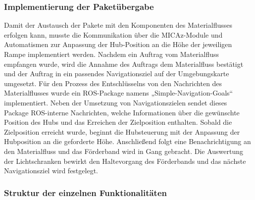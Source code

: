 \subsubsection{Implementierung der Paketübergabe}
Damit der Austausch der Pakete mit den Komponenten des Materialflusses erfolgen kann, musste die Kommunikation über die MICAz-Module und Automatismen zur Anpassung der Hub-Position an die Höhe der jeweiligen Rampe implementiert werden. Nachdem ein Auftrag vom Materialfluss empfangen wurde, wird die Annahme des Auftrags dem Materialfluss bestätigt und der Auftrag  in ein passendes Navigationsziel auf der Umgebungskarte umgesetzt.  Für den Prozess des Entschlüsselns von den Nachrichten des Materialflusses wurde ein ROS-Package namens „Simple-Navigation-Goals“ implementiert. Neben der Umsetzung von Navigationszielen sendet dieses Package ROS-interne Nachrichten, welche Informationen über die gewünschte Position des Hubs und das Erreichen der Zielposition enthalten.
Sobald die Zielposition erreicht wurde, beginnt die Hubsteuerung mit der Anpassung der Hubposition an die geforderte Höhe. Anschließend folgt eine Benachrichtigung an den Materialfluss und das Förderband wird in Gang gebracht. Die Auswertung der Lichtschranken bewirkt den Haltevorgang des Förderbands und das nächste Navigationsziel wird festgelegt.

\subsubsection{Struktur der einzelnen Funktionalitäten}



